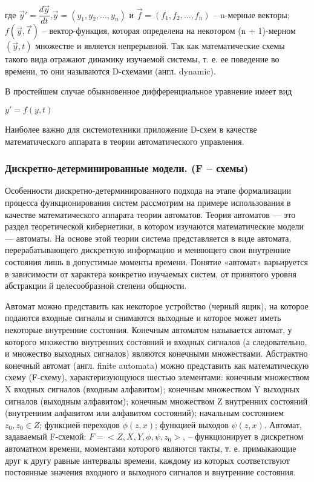  где $\vec{y}' = \dfrac{d\vec{y}}{dt}$,$\vec{y} = (y_{1}, y_{2}, ... , y_{n})$ и $\vec{f} = (f_{1}, f_{2}, ... , f_{n})$ -- n-мерные векторы;$f(\vec{y}, \vec{t})$ -- вектор-функция, которая определена на некотором (n + 1)-мерном $(\vec{y}, t)$ множестве и является непрерывной. Так как математические схемы такого вида отражают динамику изучаемой системы, т. е. ее поведение во времени, то они называются D-схемами (англ. dynamic).

 В простейшем случае обыкновенное дифференциальное уравнение имеет вид

  \begin{center}
    $y' = f(y, t)$
  \end{center}
 Наиболее важно для системотехники приложение D-схем в качестве математического аппарата в теории автоматического управления.

 \subsubsection{Дискретно-детерминированные модели. (F -- схемы)}

 Особенности дискретно-детерминированного подхода на этапе формализации процесса функционирования систем рассмотрим на примере использования в качестве математического аппарата теории автоматов. Теория автоматов — это раздел теоретической кибернетики, в котором изучаются математические модели — автоматы. На основе этой теории система представляется в виде автомата, перерабатывающего дискретную информацию и меняющего свои внутренние состояния лишь в допустимые моменты времени. Понятие «автомат» варьируется в зависимости от характера конкретно изучаемых систем, от принятого уровня абстракции й целесообразной степени общности.

 Автомат можно представить как некоторое устройство (черный ящик), на которое подаются входные сигналы и снимаются выходные и которое может иметь некоторые внутренние состояния. Конечным автоматом называется автомат, у которого множество внутренних состояний и входных сигналов (а следовательно, и множество выходных сигналов) являются конечными множествами. Абстрактно конечный автомат (англ. finite automata) можно представить как математическую схему (F-схему), характеризующуюся шестью элементами: конечным множеством X входных сигналов (входным алфавитом); конечным множеством Y выходных сигналов (выходным алфавитом); конечным множеством Z внутренних состояний (внутренним алфавитом или алфавитом состояний); начальным состоянием $z_{0}, z_{0} \in Z $; функцией переходов $\phi(z, x)$; функцией выходов $\psi(z, x)$. Автомат, задаваемый F-схемой: $F = <Z, X, Y, \phi, \psi, z_{0}>$, -- функционирует в дискретном автоматном времени, моментами которого являются такты, т. е. примыкающие друг к другу равные интервалы времени, каждому из которых соответствуют постоянные значения входного и выходного сигналов и внутренние состояния.

